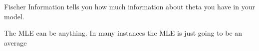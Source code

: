
Fischer Information tells you how much information about theta you have in your model.

 The MLE can be anything.  In many instances the MLE is just going to be an average
